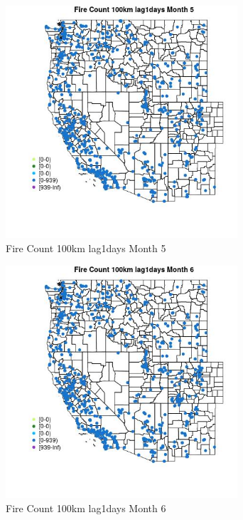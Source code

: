 \begin{figure} 
\centering  
\includegraphics[width=0.77\textwidth]{Code_Outputs/Report_ML_input_PM25_Step4_part_e_de_duplicated_aves_compiled_2019-05-21wNAs_MapObsMo5Fire_Count_100km_lag1days.jpg} 
\caption{\label{fig:Report_ML_input_PM25_Step4_part_e_de_duplicated_aves_compiled_2019-05-21wNAsMapObsMo5Fire_Count_100km_lag1days}Fire Count 100km lag1days Month 5} 
\end{figure} 
 

\clearpage 

\begin{figure} 
\centering  
\includegraphics[width=0.77\textwidth]{Code_Outputs/Report_ML_input_PM25_Step4_part_e_de_duplicated_aves_compiled_2019-05-21wNAs_MapObsMo6Fire_Count_100km_lag1days.jpg} 
\caption{\label{fig:Report_ML_input_PM25_Step4_part_e_de_duplicated_aves_compiled_2019-05-21wNAsMapObsMo6Fire_Count_100km_lag1days}Fire Count 100km lag1days Month 6} 
\end{figure} 
 


